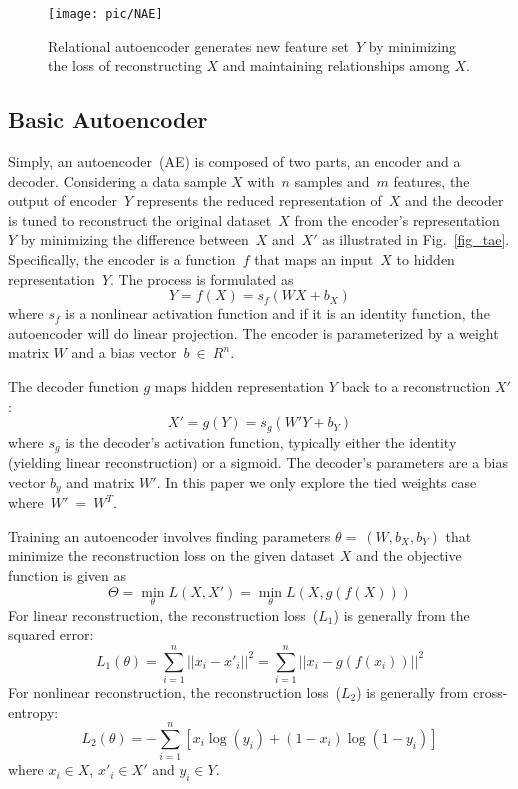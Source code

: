 \documentclass[conference]{IEEEtran}
\begin{document}
	\begin{figure}[!t]
		\centering
		\texttt{[image: pic/NAE]}
		\caption{Relational autoencoder generates new feature set~$Y$ by minimizing the loss of reconstructing $X$ and maintaining relationships among $X$.}
		\label{fig_nae}
	\end{figure}
	
	\subsection{Basic Autoencoder}
	Simply, an autoencoder~(AE) is composed of two parts, an encoder and a decoder. Considering a data sample $X$ with~$n$ samples and~$m$ features, the output of encoder~$Y$ represents the reduced representation of~$X$ and the decoder is tuned to reconstruct the original dataset~$X$ from the encoder's representation~$Y$ by minimizing the difference between~$X$ and~$X'$ as illustrated in Fig.~\ref{fig_tae}. Specifically, the encoder is a function~$f$ that maps an input~$X$ to hidden representation~$Y$. The process is formulated as
	\begin{equation}
	Y = f(X) = s_{f}(WX + b_{X})
	\end{equation}
	where $s_{f}$ is a nonlinear activation function and if it is an identity function, the autoencoder will do linear projection. The encoder is parameterized by a weight matrix $W$ and a bias vector~$b~\in~R^{n}$.
	
	The decoder function $g$ maps hidden representation $Y$ back to a reconstruction $X'$:
	\begin{equation}
	X' = g(Y) = s_{g}(W'Y + b_{Y})
	\end{equation}
	where $s_{g}$ is the decoder's activation function, typically either the identity (yielding linear reconstruction) or a sigmoid. The decoder's parameters are a bias vector $b_{y}$ and matrix $W'$. In this paper we only explore the tied weights case where~$W'~=~W^{T}$.
	
	Training an autoencoder involves finding parameters $\theta=~(W, b_{X}, b_{Y})$ that minimize the reconstruction loss on the given dataset $X$ and the objective function is given as
	\begin{equation}
	\Theta = \min_{\theta} L(X, X') = \min_{\theta} L(X, g(f(X)))
	\end{equation}
	For linear reconstruction, the reconstruction loss~($L_{1}$) is generally from the squared error:
	\begin{equation}
	L_{1}(\theta) = \sum_{i=1}^{n} ||x_{i}-x'_{i}||^{2} = \sum_{i=1}^{n} ||x_{i}-g(f(x_{i}))||^{2}
	\end{equation}
	For nonlinear reconstruction, the reconstruction loss~($L_{2}$) is generally from cross-entropy:
	\begin{equation}
	L_{2}(\theta) = -\sum^{n}_{i=1}\left[ x_{i}\log(y_{i}) + (1-x_{i})\log(1-y_{i}) \right]
	\end{equation}
	where $x_{i} \in X$, $x'_{i} \in X'$ and $y_{i} \in Y$.
	
\end{document}
